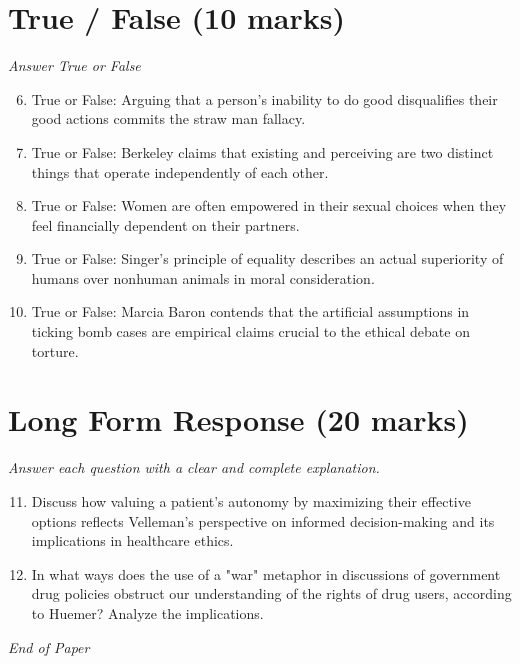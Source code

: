 \documentclass[12pt]{article}
\begin{document}
\section*{True / False (10 marks)}
\textit{Answer True or False}
\begin{enumerate}[label=\arabic*.]
\setcounter{enumi}{5}
\item True or False: Arguing that a person's inability to do good disqualifies their good actions commits the straw man fallacy.
\item True or False: Berkeley claims that existing and perceiving are two distinct things that operate independently of each other.
\item True or False: Women are often empowered in their sexual choices when they feel financially dependent on their partners.
\item True or False: Singer's principle of equality describes an actual superiority of humans over nonhuman animals in moral consideration.
\item True or False: Marcia Baron contends that the artificial assumptions in ticking bomb cases are empirical claims crucial to the ethical debate on torture.
\end{enumerate}

\section*{Long Form Response (20 marks)}
\textit{Answer each question with a clear and complete explanation.}
\begin{enumerate}[label=\arabic*.]
\setcounter{enumi}{10}
\item Discuss how valuing a patient's autonomy by maximizing their effective options reflects Velleman's perspective on informed decision-making and its implications in healthcare ethics.
\item In what ways does the use of a "war" metaphor in discussions of government drug policies obstruct our understanding of the rights of drug users, according to Huemer? Analyze the implications.
\end{enumerate}

\vfill
\noindent\textit{End of Paper}
\end{document}
